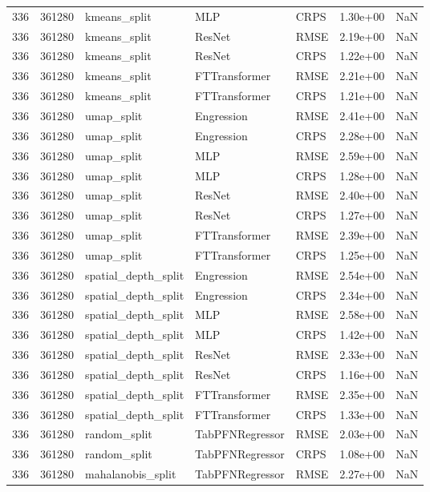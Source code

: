 \begin{tabular}{rrlllrr}
336 & 361280 & kmeans\_split & MLP & CRPS & 1.30e+00 & NaN \\
336 & 361280 & kmeans\_split & ResNet & RMSE & 2.19e+00 & NaN \\
336 & 361280 & kmeans\_split & ResNet & CRPS & 1.22e+00 & NaN \\
336 & 361280 & kmeans\_split & FTTransformer & RMSE & 2.21e+00 & NaN \\
336 & 361280 & kmeans\_split & FTTransformer & CRPS & 1.21e+00 & NaN \\
336 & 361280 & umap\_split & Engression & RMSE & 2.41e+00 & NaN \\
336 & 361280 & umap\_split & Engression & CRPS & 2.28e+00 & NaN \\
336 & 361280 & umap\_split & MLP & RMSE & 2.59e+00 & NaN \\
336 & 361280 & umap\_split & MLP & CRPS & 1.28e+00 & NaN \\
336 & 361280 & umap\_split & ResNet & RMSE & 2.40e+00 & NaN \\
336 & 361280 & umap\_split & ResNet & CRPS & 1.27e+00 & NaN \\
336 & 361280 & umap\_split & FTTransformer & RMSE & 2.39e+00 & NaN \\
336 & 361280 & umap\_split & FTTransformer & CRPS & 1.25e+00 & NaN \\
336 & 361280 & spatial\_depth\_split & Engression & RMSE & 2.54e+00 & NaN \\
336 & 361280 & spatial\_depth\_split & Engression & CRPS & 2.34e+00 & NaN \\
336 & 361280 & spatial\_depth\_split & MLP & RMSE & 2.58e+00 & NaN \\
336 & 361280 & spatial\_depth\_split & MLP & CRPS & 1.42e+00 & NaN \\
336 & 361280 & spatial\_depth\_split & ResNet & RMSE & 2.33e+00 & NaN \\
336 & 361280 & spatial\_depth\_split & ResNet & CRPS & 1.16e+00 & NaN \\
336 & 361280 & spatial\_depth\_split & FTTransformer & RMSE & 2.35e+00 & NaN \\
336 & 361280 & spatial\_depth\_split & FTTransformer & CRPS & 1.33e+00 & NaN \\
336 & 361280 & random\_split & TabPFNRegressor & RMSE & 2.03e+00 & NaN \\
336 & 361280 & random\_split & TabPFNRegressor & CRPS & 1.08e+00 & NaN \\
336 & 361280 & mahalanobis\_split & TabPFNRegressor & RMSE & 2.27e+00 & NaN \\

\end{tabular}
